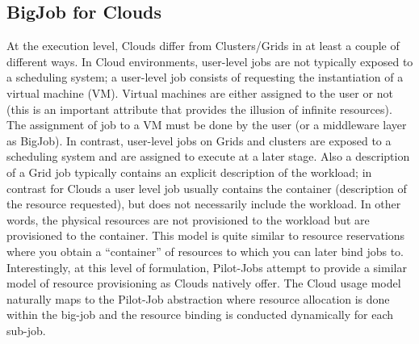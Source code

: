 \documentclass[conference,final]{IEEEtran}
\newcommand{\up}{\vspace*{-1em}}
\newcommand{\jhanote}[1]{ {\textcolor{red} { ***SJ: #1 }}}
\newcommand{\jhanote}[1]{}
\begin{document}



\subsection{BigJob for Clouds}
\up


At the execution level, Clouds differ from Clusters/Grids in at least
a couple of different ways. In Cloud environments, user-level jobs are
not typically exposed to a scheduling system; a user-level job
consists of requesting the instantiation of a virtual machine (VM).
Virtual machines are either assigned to the user or not (this is an
important attribute that provides the illusion of infinite resources).
The assignment of job to a VM must be done by the user (or a
middleware layer as BigJob).  In contrast, user-level jobs on Grids
and clusters are exposed to a scheduling system and are assigned to
execute at a later stage.  Also a description of a Grid job
typically contains an explicit description of the workload; in contrast
for Clouds a user level job usually contains the container
(description of the resource requested), but does not necessarily
include the workload. In other words, the physical resources are not
provisioned to the workload but are provisioned to the container.
This model is quite similar to resource reservations where you obtain
a ``container'' of resources to which you can later bind jobs
to. Interestingly, at this level of formulation, Pilot-Jobs attempt to
provide a similar model of resource provisioning as Clouds natively
offer. The Cloud usage model naturally maps to the Pilot-Job abstraction 
where resource allocation is done within the big-job and the resource 
binding is conducted dynamically for each sub-job.
\end{document}
